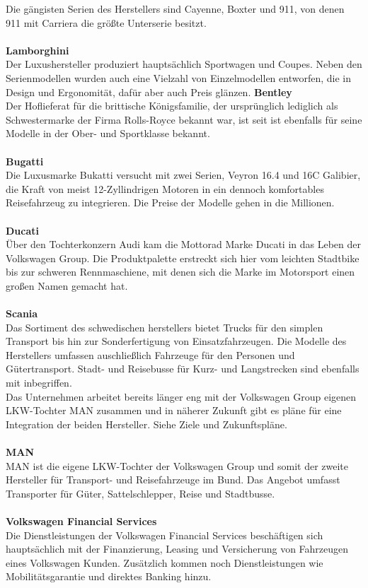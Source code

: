 \documentclass[12pt]{article}
\begin{document}
Die gängisten Serien des Herstellers sind Cayenne, Boxter und 911, von denen 911 mit Carriera die größte Unterserie besitzt.\\
\\
\textbf{Lamborghini}\\
Der Luxushersteller produziert hauptsächlich Sportwagen und Coupes. Neben den Serienmodellen wurden auch eine
Vielzahl von Einzelmodellen entworfen, die in Design und Ergonomität, dafür aber auch Preis glänzen.
\newpage
\textbf{Bentley}\\
Der Hoflieferat für die brittische Königsfamilie, der ursprünglich lediglich als Schwestermarke der Firma Rolls-Royce bekannt war, ist seit  ist ebenfalls für seine Modelle in der Ober- und Sportklasse bekannt.\\
\\
\textbf{Bugatti}\\
Die Luxusmarke Bukatti versucht mit zwei Serien, Veyron 16.4 und 16C Galibier, die Kraft von meist 12-Zyllindrigen Motoren in ein dennoch komfortables Reisefahrzeug zu integrieren. Die Preise der Modelle gehen in die Millionen.\\
\\
\textbf{Ducati}\\
Über den Tochterkonzern Audi kam die Mottorad Marke Ducati in das Leben der Volkswagen Group. Die Produktpalette erstreckt sich hier vom leichten Stadtbike bis zur schweren Rennmaschiene, mit denen sich die Marke im Motorsport einen großen Namen gemacht hat.\\
\\
\textbf{Scania}\\
Das Sortiment des schwedischen herstellers bietet Trucks für den simplen Transport bis hin zur Sonderfertigung von Einsatzfahrzeugen. Die Modelle des Herstellers umfassen auschließlich Fahrzeuge für den Personen und Gütertransport. Stadt- und Reisebusse für Kurz- und Langstrecken sind ebenfalls mit inbegriffen.\\
Das Unternehmen arbeitet bereits länger eng mit der Volkswagen Group eigenen LKW-Tochter MAN zusammen und in näherer Zukunft gibt es pläne für eine Integration der beiden Hersteller. Siehe Ziele und Zukunftspläne.\\
\\
\textbf{MAN}\\
MAN ist die eigene LKW-Tochter der Volkswagen Group und somit der zweite Hersteller für Transport- und Reisefahrzeuge im Bund. Das Angebot umfasst Transporter für Güter, Sattelschlepper, Reise und Stadtbusse.\\
\\
\textbf{Volkswagen Financial Services}\\
Die Dienstleistungen der Volkswagen Financial Services beschäftigen sich hauptsächlich mit der Finanzierung, Leasing und Versicherung von Fahrzeugen eines Volkswagen Kunden. Zusätzlich kommen noch Dienstleistungen wie Mobilitätsgarantie und direktes Banking hinzu. \cite{vw-produkte} \cite{audiRinge} \cite{audiNeuwagen} \cite{vwPorscheUebernahme}
\end{document}
